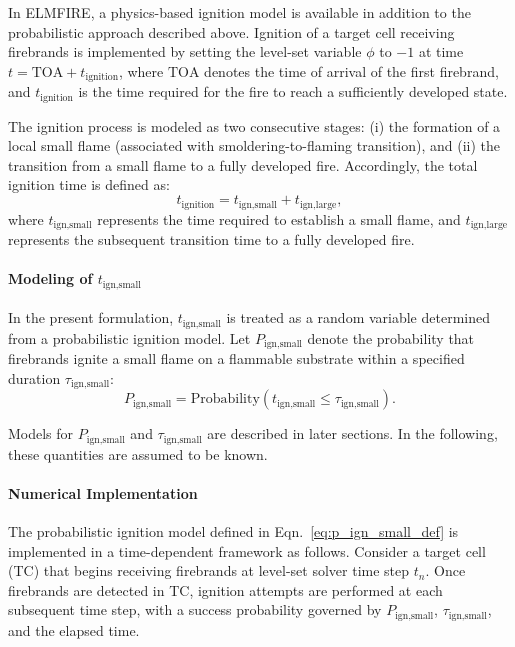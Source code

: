 In ELMFIRE, a physics-based ignition model is available in addition to the probabilistic approach described above. Ignition of a target cell receiving firebrands is implemented by setting the level-set variable $\phi$ to $-1$ at time $t = \mathrm{TOA} + t_{\text{ignition}}$, where $\mathrm{TOA}$ denotes the time of arrival of the first firebrand, and $t_{\text{ignition}}$ is the time required for the fire to reach a sufficiently developed state.

The ignition process is modeled as two consecutive stages: (i) the formation of a local small flame (associated with smoldering-to-flaming transition), and (ii) the transition from a small flame to a fully developed fire. Accordingly, the total ignition time is defined as:
\begin{equation}\label{eq:t_ign_def}
t_{\text{ignition}} = t_{\text{ign,small}} + t_{\text{ign,large}},
\end{equation}
where $t_{\text{ign,small}}$ represents the time required to establish a small flame, and $t_{\text{ign,large}}$ represents the subsequent transition time to a fully developed fire.

\paragraph{Modeling of $t_{\text{ign,small}}$}

In the present formulation, $t_{\text{ign,small}}$ is treated as a random variable determined from a probabilistic ignition model. Let $P_{\text{ign,small}}$ denote the probability that firebrands ignite a small flame on a flammable substrate within a specified duration $\tau_{\text{ign,small}}$:
\begin{equation}\label{eq:p_ign_small_def}
P_{\text{ign,small}} = \mathrm{Probability}\!\left(t_{\text{ign,small}} \le \tau_{\text{ign,small}}\right).
\end{equation}

Models for $P_{\text{ign,small}}$ and $\tau_{\text{ign,small}}$ are described in later sections. In the following, these quantities are assumed to be known.

\paragraph{Numerical Implementation}

The probabilistic ignition model defined in Eqn.~\ref{eq:p_ign_small_def} is implemented in a time-dependent framework as follows. Consider a target cell (TC) that begins receiving firebrands at level-set solver time step $t_n$. Once firebrands are detected in TC, ignition attempts are performed at each subsequent time step, with a success probability governed by $P_{\text{ign,small}}$, $\tau_{\text{ign,small}}$, and the elapsed time.

